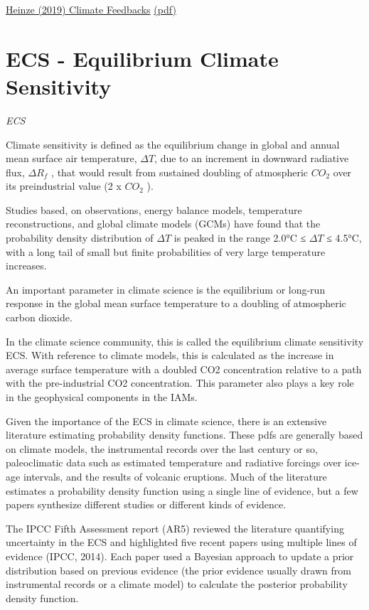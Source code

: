 \documentclass[
]{book}
\begin{document}
\href{https://www.researchgate.net/publication/334387499_ESD_Reviews_Climate_feedbacks_in_the_Earth_system_and_prospects_for_their_evaluation}{Heinze (2019) Climate Feedbacks}
\href{pdf/Heinze_2019_Climate_Feedbacks.pdf}{(pdf)}

\hypertarget{ecs---equilibrium-climate-sensitivity}{%
\section{ECS - Equilibrium Climate Sensitivity}\label{ecs---equilibrium-climate-sensitivity}}

\emph{ECS}

Climate sensitivity is defined as the equilibrium change in global and annual mean
surface air temperature, \(\Delta T\), due to an increment in
downward radiative flux, \(\Delta R_{f}\) ,
that would result from sustained doubling of atmospheric \(CO_2\) over its
preindustrial value (2 x \(CO_2\) ).

Studies based, on observations, energy balance models, temperature reconstructions,
and global climate models (GCMs) have found that the probability
density distribution of \(\Delta T\) is peaked in the range
2.0°C ≤ \(\Delta T\) ≤ 4.5°C, with a long tail of small but
finite probabilities of very large temperature increases.

An important parameter in climate science is
the equilibrium or long-run response in the global mean surface temperature
to a doubling of atmospheric carbon dioxide.

In the climate science community, this is called
the equilibrium climate sensitivity ECS.
With reference to climate models, this is calculated as
the increase in average surface temperature with a doubled CO2 concentration
relative to a path with the pre-industrial CO2 concentration.
This parameter also plays a key role in the geophysical components
in the IAMs.

Given the importance of the ECS in climate science,
there is an extensive literature estimating probability density functions.
These pdfs are generally based on climate models, the instrumental
records over the last century or so, paleoclimatic data such
as estimated temperature and radiative forcings over ice-age intervals,
and the results of volcanic eruptions.
Much of the literature estimates a probability density function
using a single line of evidence,
but a few papers synthesize different studies or different kinds of evidence.

The IPCC Fifth Assessment report (AR5) reviewed the literature
quantifying uncertainty in the ECS and highlighted
five recent papers using multiple lines of evidence (IPCC, 2014).
Each paper used a Bayesian approach to update a prior distribution
based on previous evidence
(the prior evidence usually drawn from instrumental records or a climate model)
to calculate the posterior probability density function.
\end{document}
